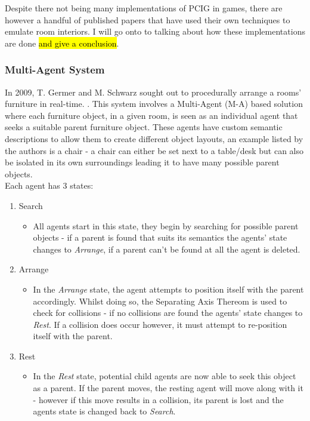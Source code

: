 \bigskip
Despite there not being many implementations of PCIG in games, there are however a handful of published papers that have used their own techniques to emulate room interiors. I will go onto to talking about how these implementations are done \hl{and give a conclusion}.

\bigskip
\subsubsection{Multi-Agent System}
In 2009, T. Germer and M. Schwarz sought out to procedurally arrange a rooms' furniture in real-time. \cite{real-time-walkthroughs}\cite{youtube:real-time-walkthroughs}. This system involves a Multi-Agent (M-A) based solution where each furniture object, in a given room, is seen as an individual agent that seeks a suitable parent furniture object. These agents have custom semantic descriptions to allow them to create different object layouts, an example listed by the authors is a chair - a chair can either be set next to a table/desk but can also be isolated in its own surroundings leading it to have many possible parent objects.\\
Each agent has 3 states:
\begin{enumerate}
    \item Search
        \begin{itemize}
            \item All agents start in this state, they begin by searching for possible parent objects - if a parent is found that suits its semantics the agents' state changes to \textit{Arrange}, if a parent can't be found at all the agent is deleted.
        \end{itemize}
    \item Arrange
        \begin{itemize}
            \item In the \textit{Arrange} state, the agent attempts to position itself with the parent accordingly. Whilst doing so, the Separating Axis Thereom \cite{separating-axis-thereom} is used to check for collisions - if no collisions are found the agents' state changes to \textit{Rest}. If a collision does occur however, it must attempt to re-position itself with the parent.
        \end{itemize}
    \item Rest
        \begin{itemize}
            \item In the \textit{Rest} state, potential child agents are now able to seek this object as a parent. If the parent moves, the resting agent will move along with it - however if this move results in a collision, its parent is lost and the agents state is changed back to \textit{Search}.
        \end{itemize}
\end{enumerate}
